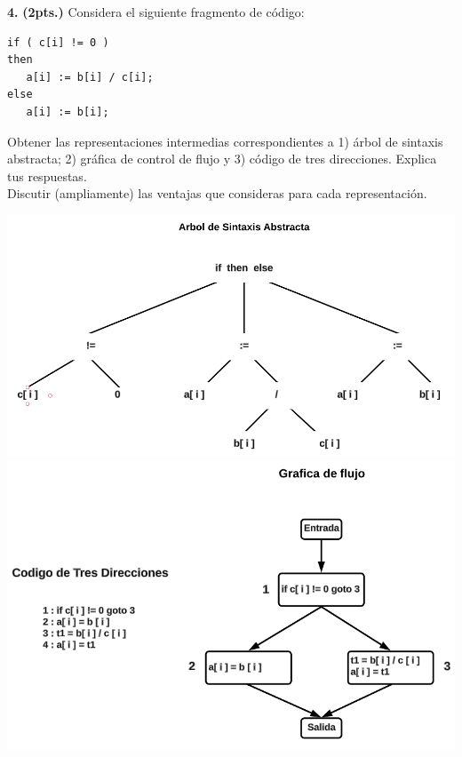 \textbf{4.} \textbf{(2pts.)} Considera el siguiente fragmento de c\'odigo:
\begin{lstlisting}
if ( c[i] != 0 )
then 
   a[i] := b[i] / c[i];
else 
   a[i] := b[i];
\end{lstlisting}
Obtener las representaciones intermedias correspondientes a 1) \'arbol de 
sintaxis abstracta; 2) gr\'afica de control de flujo y 3) c\'odigo de tres 
direcciones. Explica tus respuestas. \\
Discutir (ampliamente) las ventajas que consideras para cada representaci\'on.

\begin{center}

    \includegraphics[scale = 0.5]{4_1}
    \includegraphics[scale = 0.5]{4_2}

 \end{center}


